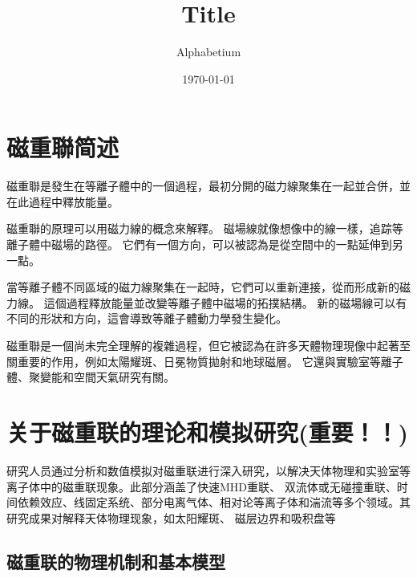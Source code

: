 \documentclass[12pt, a4paper, oneside]{article}
\title{Title}
\date{\today}
\author{Alphabetium}
\begin{document}
\begin{spacing}{2.0}
\tableofcontents
\maketitle


\section{磁重聯简述}

磁重聯是發生在等離子體中的一個過程，最初分開的磁力線聚集在一起並合併，並在此過程中釋放能量。

磁重聯的原理可以用磁力線的概念來解釋。 磁場線就像想像中的線一樣，追踪等離子體中磁場的路徑。 它們有一個方向，可以被認為是從空間中的一點延伸到另一點。

當等離子體不同區域的磁力線聚集在一起時，它們可以重新連接，從而形成新的磁力線。 這個過程釋放能量並改變等離子體中磁場的拓撲結構。 
新的磁場線可以有不同的形狀和方向，這會導致等離子體動力學發生變化。

磁重聯是一個尚未完全理解的複雜過程，但它被認為在許多天體物理現像中起著至關重要的作用，例如太陽耀斑、日冕物質拋射和地球磁層。 
它還與實驗室等離子體、聚變能和空間天氣研究有關。
\section{关于磁重联的理论和模拟研究(重要！！)}
研究人员通过分析和数值模拟对磁重联进行深入研究，以解决天体物理和实验室等离子体中的磁重联现象。此部分涵盖了快速MHD重联、
双流体或无碰撞重联、时间依赖效应、线固定系统、部分电离气体、相对论等离子体和湍流等多个领域。其研究成果对解释天体物理现象，如太阳耀斑、
磁层边界和吸积盘等
\subsection{磁重联的物理机制和基本模型}

\end{spacing}
\end{document}
